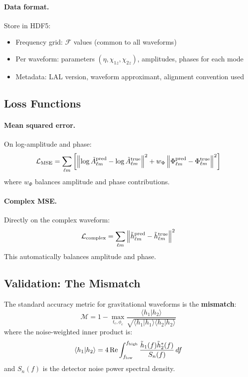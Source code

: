 \documentclass[11pt,a4paper]{article}
\newcommand{\htlm}{\tilde{h}_{\ell m}}
\newcommand{\Atlm}{\tilde{A}_{\ell m}}
\newcommand{\Philm}{\Phi_{\ell m}}
\newcommand{\Mf}{\mathcal{F}}
\begin{document}
\paragraph{Data format.}
Store in HDF5:
\begin{itemize}
    \item Frequency grid: $\Mf$ values (common to all waveforms)
    \item Per waveform: parameters $(\eta, \chi_{1z}, \chi_{2z})$, amplitudes, phases for each mode
    \item Metadata: LAL version, waveform approximant, alignment convention used
\end{itemize}

\subsection{Loss Functions}

\paragraph{Mean squared error.}
On log-amplitude and phase:
\begin{equation}
    \mathcal{L}_{\rm MSE} = \sum_{\ell m} \left[ \left\| \log \Atlm^{\rm pred} - \log \Atlm^{\rm true} \right\|^2 + w_\Phi \left\| \Philm^{\rm pred} - \Philm^{\rm true} \right\|^2 \right]
\end{equation}
where $w_\Phi$ balances amplitude and phase contributions.

\paragraph{Complex MSE.}
Directly on the complex waveform:
\begin{equation}
    \mathcal{L}_{\rm complex} = \sum_{\ell m} \left\| \htlm^{\rm pred} - \htlm^{\rm true} \right\|^2
\end{equation}
This automatically balances amplitude and phase.

\subsection{Validation: The Mismatch}
\label{sec:mismatch}

The standard accuracy metric for gravitational waveforms is the \textbf{mismatch}:
\begin{equation}
    \boxed{
    \mathcal{M} = 1 - \max_{t_c, \phi_c} \frac{\langle h_1 | h_2 \rangle}{\sqrt{\langle h_1 | h_1 \rangle \langle h_2 | h_2 \rangle}}
    }
    \label{eq:mismatch}
\end{equation}
where the noise-weighted inner product is:
\begin{equation}
    \langle h_1 | h_2 \rangle = 4 \, \text{Re} \int_{f_{\rm low}}^{f_{\rm high}} \frac{\tilde{h}_1(f) \tilde{h}_2^*(f)}{S_n(f)} \, df
\end{equation}
and $S_n(f)$ is the detector noise power spectral density.
\end{document}
